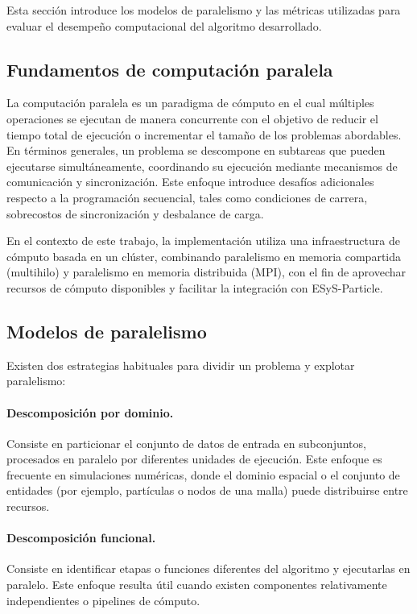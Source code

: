 \documentclass[a4paper,11pt]{book}
\newcommand{\red}[1]{\textcolor{red}{#1}}
\begin{document}
Esta sección introduce los modelos de paralelismo y las métricas utilizadas para evaluar el desempeño computacional del algoritmo desarrollado.


\subsection{Fundamentos de computación paralela}

La computación paralela es un paradigma de cómputo en el cual múltiples operaciones se ejecutan de manera concurrente con el objetivo de reducir el tiempo total de ejecución o incrementar el tamaño de los problemas abordables. En términos generales, un problema se descompone en subtareas que pueden ejecutarse simultáneamente, coordinando su ejecución mediante mecanismos de comunicación y sincronización. Este enfoque introduce desafíos adicionales respecto a la programación secuencial, tales como condiciones de carrera, sobrecostos de sincronización y desbalance de carga.

En el contexto de este trabajo, la implementación utiliza una infraestructura de cómputo basada en un clúster, combinando paralelismo en memoria compartida (multihilo) y paralelismo en memoria distribuida (MPI), con el fin de aprovechar recursos de cómputo disponibles y facilitar la integración con ESyS-Particle.

\subsection{Modelos de paralelismo}

Existen dos estrategias habituales para dividir un problema y explotar paralelismo:

\paragraph{Descomposición por dominio.}
Consiste en particionar el conjunto de datos de entrada en subconjuntos, procesados en paralelo por diferentes unidades de ejecución. Este enfoque es frecuente en simulaciones numéricas, donde el dominio espacial o el conjunto de entidades (por ejemplo, partículas o nodos de una malla) puede distribuirse entre recursos.

\paragraph{Descomposición funcional.}
Consiste en identificar etapas o funciones diferentes del algoritmo y ejecutarlas en paralelo. Este enfoque resulta útil cuando existen componentes relativamente independientes o pipelines de cómputo.
\end{document}
